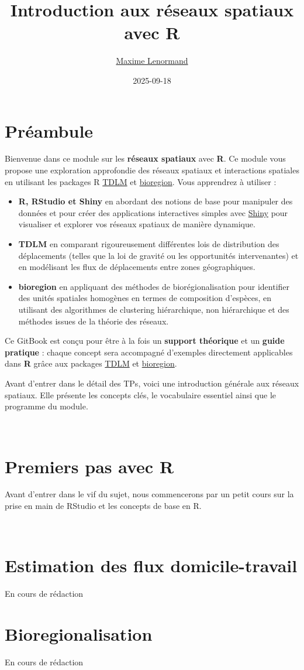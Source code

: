 \documentclass[
]{article}
\title{Introduction aux réseaux spatiaux avec R}
\author{\href{https://www.maximelenormand.com/}{Maxime Lenormand}}
\date{2025-09-18}
\begin{document}
\maketitle

{
\setcounter{tocdepth}{2}
\tableofcontents
}
\section*{Préambule}\label{preambule}

Bienvenue dans ce module sur les \textbf{réseaux spatiaux} avec \textbf{R}. Ce module vous
propose une exploration approfondie des réseaux spatiaux et interactions
spatiales en utilisant les packages R \href{https://rtdlm.github.io/TDLM/}{TDLM} et
\href{https://biorgeo.github.io/bioregion/}{bioregion}. Vous apprendrez
à utiliser :

\begin{itemize}
\item
  \textbf{R, RStudio et Shiny} en abordant des
  notions de base pour manipuler des données et pour créer des applications
  interactives simples avec \href{https://shiny.posit.co/}{Shiny} pour visualiser et
  explorer vos réseaux spatiaux de manière dynamique.
\item
  \textbf{TDLM} en comparant rigoureusement différentes lois de distribution des
  déplacements (telles que la loi de gravité ou les opportunités intervenantes)
  et en modélisant les flux de déplacements entre zones géographiques.
\item
  \textbf{bioregion} en appliquant des méthodes de biorégionalisation pour
  identifier des unités spatiales homogènes en termes de composition d'espèces,
  en utilisant des algorithmes de clustering hiérarchique, non hiérarchique et
  des méthodes issues de la théorie des réseaux.
\end{itemize}

Ce GitBook est conçu pour être à la fois un \textbf{support théorique} et un
\textbf{guide pratique} : chaque concept sera accompagné d'exemples directement
applicables dans \textbf{R} grâce aux packages
\href{https://rtdlm.github.io/TDLM/}{TDLM} et
\href{https://biorgeo.github.io/bioregion/}{bioregion}.

Avant d'entrer dans le détail des TPs, voici une
introduction générale aux réseaux spatiaux. Elle présente les concepts clés,
le vocabulaire essentiel ainsi que le programme du module.

~

\section{Premiers pas avec R}\label{tp1}

Avant d'entrer dans le vif du sujet, nous commencerons par un petit cours sur
la prise en main de RStudio et les concepts de base en R.

~

\section{Estimation des flux domicile-travail}\label{tp2}

En cours de rédaction

\section{Bioregionalisation}\label{tp3}

En cours de rédaction
\end{document}
